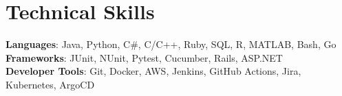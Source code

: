 \documentclass[letterpaper,11pt]{article}
\begin{document}
\section{Technical Skills}

\begin{itemize}[leftmargin=0.15in, label={}]
  \small{\item{
    \textbf{Languages}{: Java, Python, C\#, C/C++, Ruby, SQL, R, MATLAB, Bash, Go} \\
    \textbf{Frameworks}{: JUnit, NUnit, Pytest, Cucumber, Rails, ASP.NET} \\
    \textbf{Developer Tools}{: Git, Docker, AWS, Jenkins, GitHub Actions, Jira, Kubernetes, ArgoCD} \\
  }}
 \end{itemize}
\end{document}
